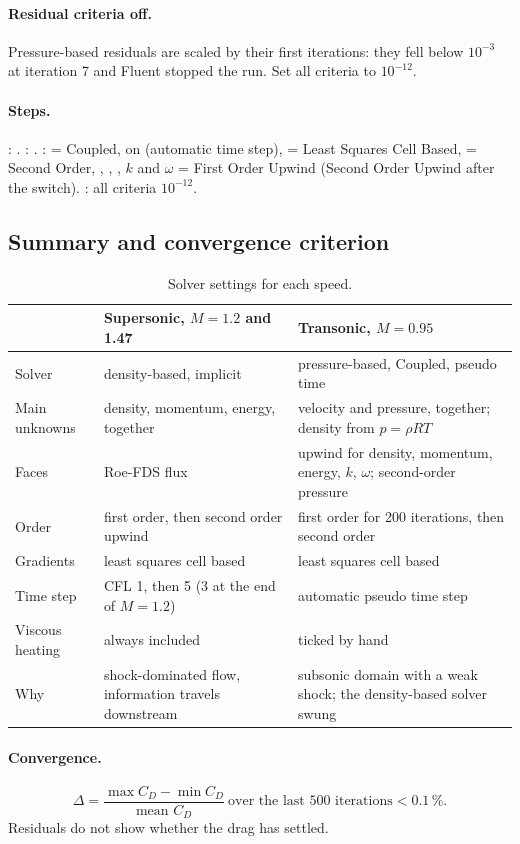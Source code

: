 \paragraph{Residual criteria off.} Pressure-based residuals are scaled by their first iterations: they fell
below $10^{-3}$ at iteration 7 and Fluent stopped the run. Set all criteria to $10^{-12}$.

\paragraph{Steps.} : . \then{}\then
{}: . :  = Coupled, 
on (automatic time step),  = Least Squares Cell Based,  = Second Order,
, , , $k$ and $\omega$ = First Order Upwind (Second Order Upwind
after the switch). \then{}: all criteria $10^{-12}$.

\subsection{Summary and convergence criterion}

\begin{table}[H]
\centering
\caption{Solver settings for each speed.}
\label{tab:solvers}
\small
\begin{tabularx}{\linewidth}{@{}>{\raggedright\arraybackslash}p{2.3cm}>{\raggedright\arraybackslash}X>{\raggedright\arraybackslash}X@{}}
\toprule
 & Supersonic, $M = 1.2$ and 1.47 & Transonic, $M = 0.95$ \\
\midrule
Solver & density-based, implicit & pressure-based, Coupled, pseudo time \\
Main unknowns & density, momentum, energy, together & velocity and pressure, together; density from $p = \rho RT$ \\
Faces & Roe-FDS flux & upwind for density, momentum, energy, $k$, $\omega$; second-order pressure \\
Order & first order, then second order upwind & first order for 200 iterations, then second order \\
Gradients & least squares cell based & least squares cell based \\
Time step & CFL 1, then 5 (3 at the end of $M = 1.2$) & automatic pseudo time step \\
Viscous heating & always included & ticked by hand \\
Why & shock-dominated flow, information travels downstream & subsonic domain with a weak shock; the density-based solver swung \\
\bottomrule
\end{tabularx}
\end{table}

\paragraph{Convergence.}
\begin{equation}
\Delta = \frac{\max C_D - \min C_D}{\text{mean } C_D}\ \text{over the last 500 iterations} < 0.1\,\%.
\end{equation}
Residuals do not show whether the drag has settled.
